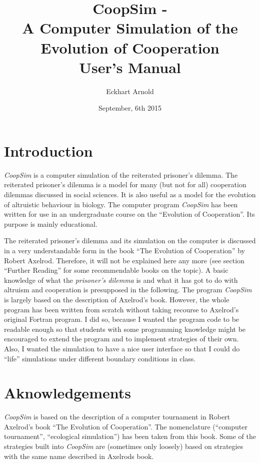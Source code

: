\documentclass[12pt,a4paper,USenglish]{article}
\begin{document}
\title{CoopSim - \\A Computer Simulation of the Evolution of Cooperation\\User's Manual}
\author{Eckhart Arnold}
\date{September, 6th 2015}

\maketitle

\tableofcontents{}


\section{Introduction}

\emph{CoopSim} is a computer simulation of the reiterated prisoner's
dilemma. The reiterated prisoner's dilemma is a model for many (but
not for all) cooperation dilemmas discussed in social sciences.
It is also useful as a model for the evolution of altruistic behaviour
in biology. The computer program \emph{CoopSim} has been written for
use in an undergraduate course on the ``Evolution of Cooperation''.
Its purpose is mainly educational.

The reiterated prisoner's dilemma and its simulation on the computer
is discussed in a very understandable form in the book ``The Evolution
of Cooperation'' by Robert Axelrod. Therefore, it will not be explained
here any more (see section ``Further Reading'' for some recommendable
books on the topic). A basic knowledge of what the \emph{prisoner's dilemma}
is and what it has got to do with altruism and cooperation is presupposed
in the following. The program \emph{CoopSim} is largely based on the
description of Axelrod's book. However, the whole program has been
written from scratch without taking recourse to Axelrod's original
Fortran program. I did so, because I wanted the program code to be
readable enough so that students with some programming knowledge might
be encouraged to extend the program and to implement strategies of
their own. Also, I wanted the simulation to have a nice user interface
so that I could do ``life'' simulations under different boundary
conditions in class.

\section{Aknowledgements}

\emph{CoopSim} is based on the description of a computer tournament
in Robert Axelrod's book ``The Evolution of Cooperation''. The
nomenclature (``computer tournament'', ``ecological simulation'') has
been taken from this book. Some of the strategies built into
\emph{CoopSim} are (sometimes only loosely) based on strategies with
the same name described in Axelrods book.
\end{document}
